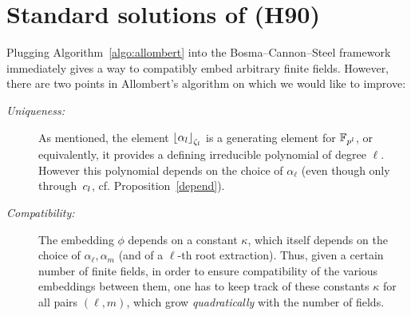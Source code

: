 \documentclass[sigconf]{acmart}
\begin{document}
\section{Standard solutions of (H90)}
\label{sec:compatibleH90}

Plugging Algorithm~\ref{algo:allombert} into the Bosma--Cannon--Steel
framework immediately gives a way to compatibly embed arbitrary finite
fields. %
However, there are two points in Allombert's algorithm on which we
would like to improve:
\begin{description}
\item[\emph{Uniqueness:}] As mentioned, the element $\left\lfloor \alpha_{l} \right\rfloor_{\zeta_l}$ is a generating element for $\mathbb{F}_{p^{l}}$,
or equivalently, it provides a defining irreducible polynomial of degree $\ell$.
However this polynomial depends on the choice of $\alpha_{\ell}$
(even though only through~$c_l$, cf. Proposition~\ref{depend}).
\item[\emph{Compatibility:}] The embedding $\phi$ depends on a constant $\kappa$,
which itself depends on the choice of $\alpha_\ell,\alpha_m$ (and of a $\ell$-th root extraction).
Thus, given a certain number of finite fields, in order to ensure compatibility of the various
embeddings between them, one has to keep track of these constants $\kappa$
for all pairs $(\ell,m)$,
which grow \emph{quadratically} with the number of fields.
\end{description}
\end{document}
